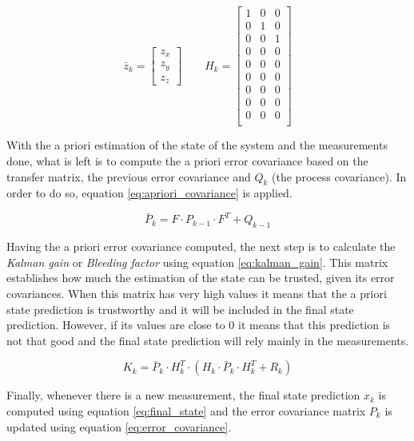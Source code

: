 \begin{equation}
\bar{z}_{k}=
\begin{bmatrix}
z_{x} \\ z_{y} \\ z_{z}
\end{bmatrix}
\qquad
H_{k}=
\begin{bmatrix}
1 & 0 & 0 \\
0 & 1 & 0 \\
0 & 0 & 1 \\
0 & 0 & 0 \\
0 & 0 & 0 \\
0 & 0 & 0 \\
0 & 0 & 0 \\
0 & 0 & 0 \\
0 & 0 & 0 \\
\end{bmatrix}
\label{eq:measurements_mats}
\end{equation}

With the a priori estimation of the state of the system and the measurements done, what is left is to compute the a priori error covariance \cite{OReilly} based on the transfer matrix, the previous error covariance and $Q_{k}$ (the process covariance). In order to do so, equation \eqref{eq:apriori_covariance} is applied.

\begin{equation}
\bar{P}_{k}=F \cdot P_{k-1} \cdot F^{T}+Q_{k-1}
\label{eq:apriori_covariance}
\end{equation}

Having the a priori error covariance computed, the next step is to calculate the \emph{Kalman gain} or \emph{Bleeding factor} using equation \eqref{eq:kalman_gain}. This matrix establishes how much the estimation of the state can be trusted, given its error covariances. When this matrix has very high values it means that the a priori state prediction is trustworthy and it will be included in the final state prediction. However, if its values are close to 0 it means that this prediction is not that good and the final state prediction will rely mainly in the measurements.

\begin{equation}
K_{k} = \bar{P}_{k} \cdot H_{k}^{T} \cdot (H_{k} \cdot \bar{P}_{k} \cdot H_{k}^{T}+R_{k})
\label{eq:kalman_gain}
\end{equation}

Finally, whenever there is a new measurement, the final state prediction $x_{k}$ is computed using equation \eqref{eq:final_state} and the error covariance matrix $P_{k}$ is updated using equation \eqref{eq:error_covariance}.

